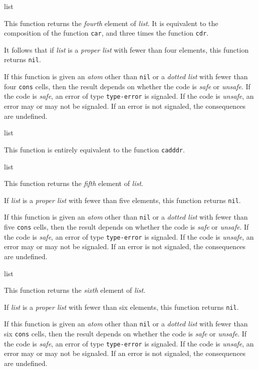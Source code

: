  {list}

This function returns the \emph{fourth} element of \textit{list}.  It
is equivalent to the composition of the function \texttt{car}, and
three times the function \texttt{cdr}.

It follows that if \textit{list} is a \emph{proper list} with fewer
than four elements, this function returns \texttt{nil}.

If this function is given an \emph{atom} other than \texttt{nil} or a
\emph{dotted list} with fewer than four \texttt{cons} cells, then the
result depends on whether the code is \emph{safe} or \emph{unsafe}.
If the code is \emph{safe}, an error of type \texttt{type-error} is
signaled.  If the code is \emph{unsafe}, an error may or may not be
signaled.  If an error is not signaled, the consequences are
undefined.

 {list}

This function is entirely equivalent to the function \texttt{cadddr}. 

 {list}

This function returns the \emph{fifth} element of \textit{list}.

If \textit{list} is a \emph{proper list} with fewer than five
elements, this function returns \texttt{nil}.

If this function is given an \emph{atom} other than \texttt{nil} or a
\emph{dotted list} with fewer than five \texttt{cons} cells, then the
result depends on whether the code is \emph{safe} or \emph{unsafe}.
If the code is \emph{safe}, an error of type \texttt{type-error} is
signaled.  If the code is \emph{unsafe}, an error may or may not be
signaled.  If an error is not signaled, the consequences are
undefined.

 {list}

This function returns the \emph{sixth} element of \textit{list}.

If \textit{list} is a \emph{proper list} with fewer than six
elements, this function returns \texttt{nil}.

If this function is given an \emph{atom} other than \texttt{nil} or a
\emph{dotted list} with fewer than six \texttt{cons} cells, then the
result depends on whether the code is \emph{safe} or \emph{unsafe}.
If the code is \emph{safe}, an error of type \texttt{type-error} is
signaled.  If the code is \emph{unsafe}, an error may or may not be
signaled.  If an error is not signaled, the consequences are
undefined.

